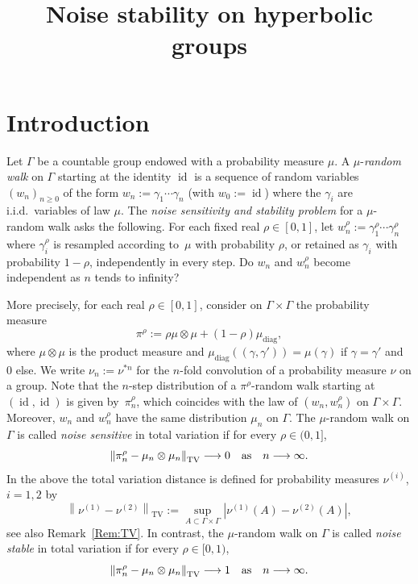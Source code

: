 \documentclass[AHL,Unicode,longabstracts,published]{cedram}
\title[Noise stability on hyperbolic groups]{Noise stability on hyperbolic groups}
\author[\initial{T.} \lastname{Bénard}]{\firstname{Timothée} \lastname{Bénard}}
\author[\initial{R.} \lastname{Tanaka}]{\firstname{Ryokichi} \lastname{Tanaka}}
\DeclareMathOperator{\id}{id}
\DeclareMathOperator{\TV}{TV}
\DeclareMathOperator{\diag}{diag}
\newcommand{\m}{\mu}
\renewcommand{\(}{\left(}
\renewcommand{\)}{\right)}
\renewcommand*{\to}{\mathchoice{\longrightarrow}{\rightarrow}{\rightarrow}{\rightarrow}}
\begin{document}
\maketitle




\section{Introduction}

Let $\Gamma$ be a countable group endowed with a probability measure $\mu$. A $\mu$-\emph{random walk} on $\Gamma$ starting at the identity $\id$ is a sequence of random variables $(w_{n})_{n\geq 0}$ of the form $w_n:=\gamma_1\cdots \gamma_n$ (with $w_0:=\id$) where the $\gamma_{i}$ are i.i.d.\ variables of law $\mu$. The \emph{noise sensitivity and stability problem} for a $\mu$-random walk asks the following. For each fixed real $\rho \in [0, 1]$, let $w_n^\rho:=\gamma_1^\rho\cdots \gamma_n^\rho$ where $\gamma_i^\rho$ is resampled according to~$\mu$ with probability $\rho$, or retained as $\gamma_i$ with probability $1-\rho$, independently in every step. Do $w_n$ and $w_n^\rho$ become independent as $n$ tends to infinity?

More precisely, for each real $\rho \in [0, 1]$, consider on $\Gamma \times \Gamma$ the probability measure
\[
\pi^\rho:=\rho \mu \otimes \mu+(1-\rho)\mu_{\diag},
\]
where $\mu\otimes \mu$ is the product measure and $\mu_{\diag}((\gamma, \gamma'))=\mu(\gamma)$ if $\gamma=\gamma'$ and $0$ else. We write $\nu_n:=\nu^{\ast n}$ for the $n$-fold convolution of a probability measure $\nu$ on a group. Note that the $n$-step distribution of a $\pi^\rho$-random walk starting at $(\id, \id)$ is given by~$\pi^\rho_n$, which coincides with the law of $(w_n, w^\rho_n)$ on $\Gamma \times \Gamma$. Moreover, $w_n$ and $w^\rho_n$ have the same distribution $\m_n$ on $\Gamma$. The $\mu$-random walk on $\Gamma$ is called \emph{noise sensitive} in total variation if for every $\rho \in (0, 1]$,
\[
\left\|\pi^\rho_n-\mu_n\otimes \mu_n\right\|_{\TV} \to 0 \quad \text{as}\quad n \to \infty.
\]
In the above the total variation distance is defined for probability measures $\nu^{(i)}$, $i=1, 2$ by
\[
\left\|\nu^{(1)}-\nu^{(2)}\right\|_{\TV}:=\sup_{A \subset \Gamma \times \Gamma}\left|\nu^{(1)}(A)-\nu^{(2)}(A)\right|,
\]
see also Remark~\ref{Rem:TV}. In contrast, the $\mu$-random walk on $\Gamma$ is called \emph{noise stable} in total variation if for every $\rho \in [0, 1)$,
\[
\left\|\pi^\rho_n-\mu_n\otimes \mu_n\right\|_{\TV} \to 1 \quad \text{as}\quad n \to \infty.
\]
\end{document}
